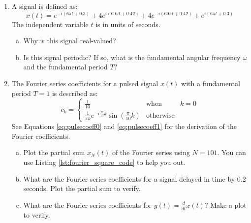 \begin{enumerate}
  \item A signal is defined as:
        \begin{equation}
          x(t) = e^{-i (6\pi  t + 0.3)}  + 4e^{i (60\pi  t + 0.42)} + 4e^{-i (60\pi t + 0.42)}  + e^{i (6\pi t + 0.3)}
        \end{equation}
        The independent variable $t$ is in units of seconds.
        \begin{enumerate}[a)]
          \item Why is this signal real-valued?
          \item Is this signal periodic? If so, what is the fundamental angular frequency $\omega$ and the fundamental period $T$?
        \end{enumerate}

  \item The Fourier series coefficients for a pulsed signal $x(t)$ with
        a fundamental period $T=1$ is described as:
        \begin{equation}
          c_k = \left\{\begin{array}{ccc}
            \frac{1}{10}                                                               & \mathrm{when}      & k=0 \\
            \frac{1}{\pi k}e^{-i\frac{\pi}{10}  k }\sin\left(\frac{\pi}{10} k  \right) & \mathrm{otherwise}
          \end{array}
          \right.
        \end{equation}
        See Equations \ref{eq:pulsecoeff0} and \ref{eq:pulsecoeff1} for the derivation of the Fourier coefficients.
        \begin{enumerate}[a)]
          \item Plot the partial sum $x_N(t)$ of the Fourier series using $N=101$. You can use Listing \ref{lst:fourier_square_code} to help you out.
          \item What are the Fourier series coefficients for a signal delayed in time by $0.2$ seconds. Plot the partial sum to verify.
          \item What are the Fourier series coefficients for $y(t)=\frac{d}{dt}x(t)$? Make a plot to verify.
        \end{enumerate}

\end{enumerate}

